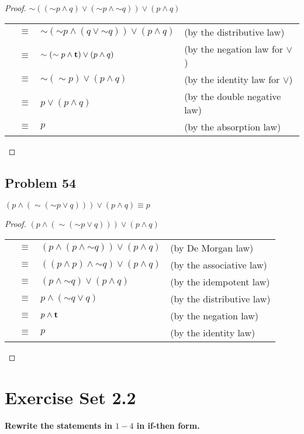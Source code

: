 \documentclass[14pt]{extarticle}
\newcommand{\true}{{\bf t}}
\begin{document}
\begin{proof}
$\sim(({\sim p} \wedge q) \vee ({\sim p} \wedge {\sim q})) \vee (p \wedge q)$

\begin{tabular}{rcll}
 & $\equiv$ & $\sim({\sim p} \wedge (q \vee {\sim q})) \vee (p \wedge q)$ & (by the distributive law) \\
 & $\equiv$ & $\sim({\sim p} \wedge \true) \vee (p \wedge q)$ &
(by the negation law for $\vee$) \\
 & $\equiv$ & $\sim({\sim p}) \vee (p \wedge q)$ & (by the identity law for $\vee$) \\
 & $\equiv$ & $p \vee (p \wedge q)$ & (by the double negative law) \\
 & $\equiv$ & $p$ & (by the absorption law) \\
\end{tabular}
\end{proof}

\subsection{Problem 54}
$(p \wedge ({\sim ({\sim p} \vee q)})) \vee (p \wedge q) \equiv p$

\begin{proof}
$(p \wedge ({\sim ({\sim p} \vee q)})) \vee (p \wedge q)$

\begin{tabular}{rcll}
 & $\equiv$ & 
$(p \wedge (p \wedge {\sim q})) \vee (p \wedge q)$ & (by De Morgan law) \\
 & $\equiv$ & $((p \wedge p) \wedge {\sim q}) \vee (p \wedge q)$ & (by the associative law) \\
 & $\equiv$ & $(p \wedge {\sim q}) \vee (p \wedge q)$ & (by the idempotent law) \\
 & $\equiv$ & $p \wedge ({\sim q} \vee q)$ & (by the distributive law) \\
 & $\equiv$ & $p \wedge \true$ & (by the negation law) \\
 & $\equiv$ & $p$ & (by the identity law) \\
\end{tabular}
\end{proof}

\section{Exercise Set 2.2}
{\bf Rewrite the statements in $1-4$ in if-then form.}
\end{document}

